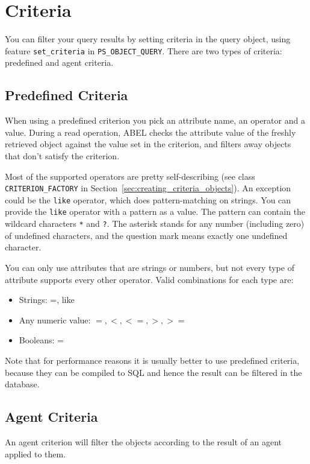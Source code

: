 \documentclass[a4paper,12pt]{report}
\begin{document}
\section{Criteria}

You can filter your query results by setting criteria in the query object, using feature \lstinline{set_criteria} in \lstinline{PS_OBJECT_QUERY}.
There are two types of criteria: predefined and agent criteria.

\subsection{Predefined Criteria}
When using a predefined criterion you pick an attribute name, an operator and a value. 
During a read operation, ABEL checks the attribute value of the freshly retrieved object against the value set in the criterion, and filters away objects that don't satisfy the criterion.

Most of the supported operators are pretty self-describing (see class \lstinline{CRITERION_FACTORY} in Section~\ref{sec:creating_criteria_objects}).
An exception could be the \lstinline!like! operator, which does pattern-matching on strings.
You can provide the \lstinline!like! operator with a pattern as a value. The pattern can contain the wildcard characters \lstinline!*! and \lstinline!?!.
The asterisk stands for any number (including zero) of undefined characters, and the question mark means exactly one undefined character.

You can only use attributes that are strings or numbers, but not every type of attribute supports every other operator. Valid combinations for each type are:

 \begin{itemize}
  \item Strings: =, like
  \item Any numeric value: $=, <, <=, >, >=$
  \item Booleans: =
 \end{itemize}

Note that for performance reasons it is usually better to use predefined criteria, because they can be compiled to SQL and hence the result can be filtered in the database.

\subsection{Agent Criteria}

An agent criterion will filter the objects according to the result of an agent applied to them.
\end{document}
